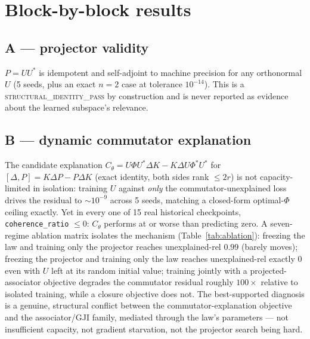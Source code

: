 \documentclass[11pt]{amsart}
\begin{document}
\section{Block-by-block results}
\label{sec:blocks}

\subsection{A --- projector validity}
$P=UU^{*}$ is idempotent and self-adjoint to machine precision for any
orthonormal $U$ (5 seeds, plus an exact $n=2$ case at tolerance
$10^{-14}$). This is a \textsc{structural\_identity\_pass} by construction
and is never reported as evidence about the learned subspace's relevance.

\subsection{B --- dynamic commutator explanation}
The candidate explanation $C_\theta = U\Phi U^{*}\Delta K - K\Delta U
\Phi^{*}U^{*}$ for $[\Delta,P] = K\Delta P - P\Delta K$ (exact identity,
both sides rank $\le 2r$) is not capacity-limited in isolation: training
$U$ against \emph{only} the commutator-unexplained loss drives the
residual to $\sim 10^{-9}$ across 5 seeds, matching a closed-form
optimal-$\Phi$ ceiling exactly. Yet in every one of 15 real historical
checkpoints, \texttt{coherence\_ratio} $\le 0$: $C_\theta$ performs at or
worse than predicting zero. A seven-regime ablation matrix isolates the
mechanism (Table~\ref{tab:ablation}): freezing the law and training only
the projector reaches unexplained-rel $0.99$ (barely moves); freezing the
projector and training only the law reaches unexplained-rel exactly $0$
even with $U$ left at its random initial value; training jointly with a
projected-associator objective degrades the commutator residual roughly
$100\times$ relative to isolated training, while a closure objective does
not. The best-supported diagnosis is a genuine, structural conflict
between the commutator-explanation objective and the associator/GJI
family, mediated through the law's parameters --- not insufficient
capacity, not gradient starvation, not the projector search being hard.
\end{document}
